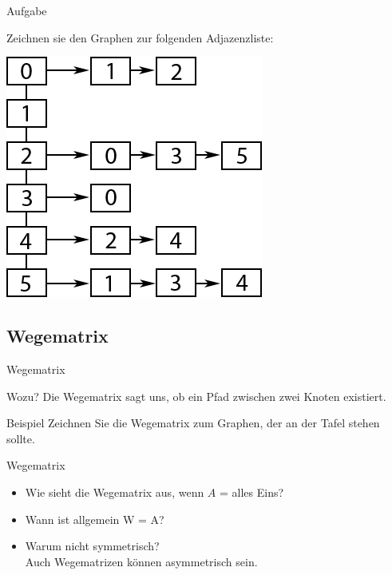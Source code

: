 	
	\begin{frame}{Aufgabe}
		\begin{block}{}
			Zeichnen sie den Graphen zur folgenden Adjazenzliste:\\
			\begin{center}
				\includegraphics[scale=0.5]{graphics/08/adjazenzliste.png}
			
			\end{center}
		\end{block}
	\end{frame}
	
	
	\subsection{Wegematrix}
	\begin{frame}{Wegematrix}
		\begin{block}{Wozu?}
			Die Wegematrix sagt uns, ob ein Pfad zwischen zwei Knoten existiert.
		\end{block}
		
		\begin{exampleblock}{Beispiel}
			Zeichnen Sie die Wegematrix zum Graphen, der an der Tafel stehen sollte.
		\end{exampleblock}
	\end{frame}
	
	
	\begin{frame}{Wegematrix}
		\begin{itemize}
			\item Wie sieht die Wegematrix aus, wenn $A$ = alles Eins?\\
			\color{darkgreen}\color{black}
			
			\item {} {Wann ist allgemein W = A?}\\
			\color{darkgreen}\color{black}
			
			\item {} {Warum nicht symmetrisch?}\\
			\color{darkgreen}\visible<6-> {Auch Wegematrizen können asymmetrisch sein.}\color{black}
		\end{itemize}
	\end{frame}
	
